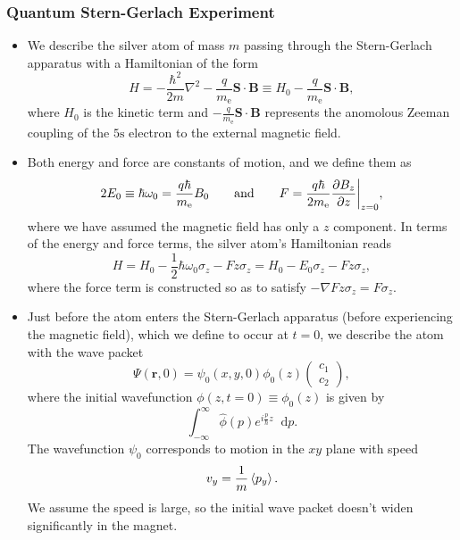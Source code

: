 \documentclass[11pt, a4paper]{article}
\newcommand{\diff}{\mathop{}\!\mathrm{d}} %
\renewcommand{\grad}{\nabla}
\renewcommand{\laplacian}{\nabla^{2}}
\newcommand{\Ham}{Hamiltonian\xspace}
\newcommand{\SG}{Stern-Gerlach\xspace}
\renewcommand{\vec}[1]{\bm{#1}}  %
\newcommand{\F}[1]{\widehat{#1}} %
\renewcommand{\r}{\vec{r}}  %
\renewcommand{\S}{\vec{S}}  %
\newcommand{\B}{\vec{B}}  %
\begin{document}
\subsubsection{Quantum Stern-Gerlach Experiment}
\begin{itemize}
    \item We describe the silver atom of mass $ m $ passing through the \SG apparatus with a \Ham of the form
    \begin{equation*}
        H = - \frac{\hbar^{2}}{2m}\laplacian - \frac{q}{m_{\text{e}}}\S \cdot \B \equiv H_{0} - \frac{q}{m_{\text{e}}} \S \cdot \B,
    \end{equation*}
    where $ H_{0} $ is the kinetic term and $ - \frac{q}{m_{\text{e}}} \S \cdot \B $ represents the anomolous Zeeman coupling of the $ 5 \mathrm{s} $ electron to the external magnetic field.

    \item Both energy and force are constants of motion, and we define them as
    \begin{equation*}
        2 E_{0} \equiv \hbar \omega_{0} = \frac{q \hbar}{m_{\text{e}}} B_{0} \qquad \text{and} \qquad F = \frac{q \hbar}{2m_{\text{e}}} \pdv{B_{z}}{z} \bigg |_{z = 0},
    \end{equation*}
    where we have assumed the magnetic field has only a $ z $ component. In terms of the energy and force terms, the silver atom's \Ham reads
    \begin{equation*}
        H = H_{0} - \frac{1}{2}\hbar \omega_{0} \sigma_{z} - F z \sigma_{z} = H_{0} - E_{0} \sigma_{z} - F z \sigma_{z},
    \end{equation*}
    where the force term is constructed so as to satisfy $ - \grad F z \sigma_{z} = F\sigma_{z} $.
    
    \item Just before the atom enters the \SG apparatus (before experiencing the magnetic field), which we define to occur at $ t = 0 $, we describe the atom with the wave packet
    \begin{equation*}
        \Psi(\r, 0) = \psi_{0}(x, y, 0) \phi_{0}(z)
        \begin{pmatrix}
            c_{1}\\
            c_{2}
        \end{pmatrix},
    \end{equation*}
    where the initial wavefunction $ \phi(z, t = 0) \equiv \phi_{0}(z) $ is given by
    \begin{equation*}
        \int_{-\infty}^{\infty}\F{\phi}(p)e^{i \frac{p}{\hbar}z}\diff p.
    \end{equation*}
    The wavefunction $ \psi_{0} $ corresponds to motion in the $ xy $ plane with speed
    \begin{equation*}
        v_{y} = \frac{1}{m}\ev{p_{y}}.
    \end{equation*}
    We assume the speed is large, so the initial wave packet doesn't widen significantly in the magnet. 


\end{itemize}
\end{document}
